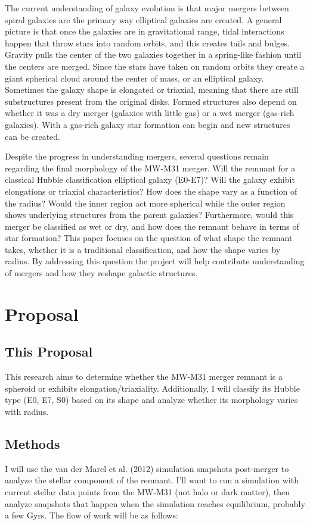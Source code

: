 \documentclass[usenatbib]{mnras}
\begin{document}
The current understanding of galaxy evolution is that major mergers between spiral galaxies are the primary way elliptical galaxies are created. A general picture is that once the galaxies are in gravitational range, tidal interactions happen that throw stars into random orbits, and this creates tails and bulges. Gravity pulls the center of the two galaxies together in a spring-like fashion until the centers are merged. Since the stars have taken on random orbits they create a giant spherical cloud around the center of mass, or an elliptical galaxy. Sometimes the galaxy shape is elongated or triaxial, meaning that there are still substructures present from the original disks. Formed structures also depend on whether it was a dry merger (galaxies with little gas) or a wet merger (gas-rich galaxies). With a gas-rich galaxy star formation can begin and new structures can be created.  

Despite the progress in understanding mergers, several questions remain regarding the final morphology of the MW-M31 merger. Will the remnant for a classical Hubble classification elliptical galaxy (E0-E7)? Will the galaxy exhibit elongations or triaxial characteristics? How does the shape vary as a function of the radius? Would the inner region act more spherical while the outer region shows underlying structures from the parent galaxies? Furthermore, would this merger be classified as wet or dry, and how does the remnant behave in terms of star formation? This paper focuses on the question of what shape the remnant takes, whether it is a traditional classification, and how the shape varies by radius. By addressing this question the project will help contribute understanding of mergers and how they reshape galactic structures. 

\section{Proposal}

\subsection{This Proposal}
This research aims to determine whether the MW-M31 merger remnant is a spheroid or exhibits elongation/triaxiality. Additionally, I will classify its Hubble type (E0, E7, S0) based on its shape and analyze whether its morphology varies with radius. 

\subsection{Methods}
I will use the van der Marel et al. (2012) simulation snapshots post-merger to analyze the stellar component of the remnant. I'll want to run a simulation with current stellar data points from the MW-M31 (not halo or dark matter), then analyze snapshots that happen when the simulation reaches equilibrium, probably a few Gyrs. The flow of work will be as follows: 
\end{document}

